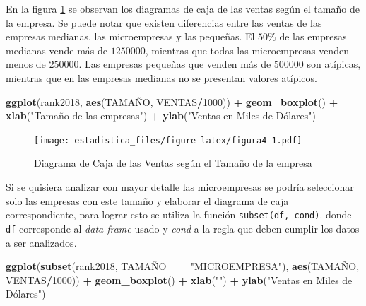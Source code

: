 \documentclass[]{book}
\newenvironment{Shaded}{\begin{snugshade}}{\end{snugshade}}
\newcommand{\KeywordTok}[1]{\textcolor[rgb]{0.13,0.29,0.53}{\textbf{#1}}}
\newcommand{\DecValTok}[1]{\textcolor[rgb]{0.00,0.00,0.81}{#1}}
\newcommand{\StringTok}[1]{\textcolor[rgb]{0.31,0.60,0.02}{#1}}
\newcommand{\OperatorTok}[1]{\textcolor[rgb]{0.81,0.36,0.00}{\textbf{#1}}}
\newcommand{\NormalTok}[1]{#1}
\begin{document}
En la figura \ref{fig:figura4} se observan los diagramas de caja de las
ventas según el tamaño de la empresa. Se puede notar que existen
diferencias entre las ventas de las empresas medianas, las microempresas
y las pequeñas. El \(50\%\) de las empresas medianas vende más de
\(1250000\), mientras que todas las microempresas venden menos de
\(250000\). Las empresas pequeñas que venden más de \(500000\) son
atípicas, mientras que en las empresas medianas no se presentan valores
atípicos.

\begin{Shaded}
\begin{Highlighting}[]
\KeywordTok{ggplot}\NormalTok{(rank2018, }\KeywordTok{aes}\NormalTok{(TAMAÑO, VENTAS}\OperatorTok{/}\DecValTok{1000}\NormalTok{)) }\OperatorTok{+}\StringTok{ }
\StringTok{  }\KeywordTok{geom_boxplot}\NormalTok{() }\OperatorTok{+}\StringTok{ }\KeywordTok{xlab}\NormalTok{(}\StringTok{"Tamaño de las empresas"}\NormalTok{) }\OperatorTok{+}
\StringTok{  }\KeywordTok{ylab}\NormalTok{(}\StringTok{"Ventas en Miles de Dólares")}
\end{Highlighting}
\end{Shaded}

\begin{figure}
\centering
\texttt{[image: estadistica\_files/figure-latex/figura4-1.pdf]}
\caption{\label{fig:figura4}Diagrama de Caja de las Ventas según el Tamaño
de la empresa}
\end{figure}

Si se quisiera analizar con mayor detalle las microempresas se podría
seleccionar solo las empresas con este tamaño y elaborar el diagrama de
caja correspondiente, para lograr esto se utiliza la función
\texttt{subset(df,\ cond)}. donde \texttt{df} corresponde al \emph{data
frame} usado y \emph{cond} a la regla que deben cumplir los datos a ser
analizados.

\begin{Shaded}
\begin{Highlighting}[]
\KeywordTok{ggplot}\NormalTok{(}\KeywordTok{subset}\NormalTok{(rank2018, TAMAÑO }\OperatorTok{==}\StringTok{ "MICROEMPRESA"}\NormalTok{), }\KeywordTok{aes}\NormalTok{(TAMAÑO, VENTAS}\OperatorTok{/}\DecValTok{1000}\NormalTok{)) }\OperatorTok{+}\StringTok{ }
\StringTok{  }\KeywordTok{geom_boxplot}\NormalTok{() }\OperatorTok{+}\StringTok{ }\KeywordTok{xlab}\NormalTok{(}\StringTok{""}\NormalTok{) }\OperatorTok{+}
\StringTok{  }\KeywordTok{ylab}\NormalTok{(}\StringTok{"Ventas en Miles de Dólares")}
\end{Highlighting}
\end{Shaded}
\end{document}
